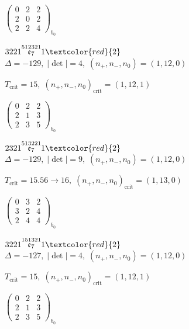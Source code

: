 \documentclass[10pt]{article}
\begin{document}
\hspace{2em}$\left(\begin{smallmatrix}0 & 2 & 2 \\ 2 & 0 & 2 \\ 2 & 2 & 4\end{smallmatrix}\right)_{\!b_0}$

\smallskip

$3221\overset{512321}{\mathfrak{e}_7}1\textcolor{red}{2}$ \quad $\Delta=-129,\; |\det|=4,\; (n_+,n_-,n_0)=(1,12,0)$

\hspace{1em}$T_{\text{crit}}=15,\; (n_+,n_-,n_0)_{\text{crit}}=(1,12,1)$

\hspace{2em}$\left(\begin{smallmatrix}0 & 2 & 2 \\ 2 & 1 & 3 \\ 2 & 3 & 5\end{smallmatrix}\right)_{\!b_0}$

\smallskip

$2321\overset{513221}{\mathfrak{e}_7}1\textcolor{red}{2}$ \quad $\Delta=-129,\; |\det|=9,\; (n_+,n_-,n_0)=(1,12,0)$

\hspace{1em}$T_{\text{crit}}=15.56 \to 16,\; (n_+,n_-,n_0)_{\text{crit}}=(1,13,0)$

\hspace{2em}$\left(\begin{smallmatrix}0 & 3 & 2 \\ 3 & 2 & 4 \\ 2 & 4 & 4\end{smallmatrix}\right)_{\!b_0}$

\smallskip

$3221\overset{151321}{\mathfrak{e}_7}1\textcolor{red}{2}$ \quad $\Delta=-127,\; |\det|=4,\; (n_+,n_-,n_0)=(1,12,0)$

\hspace{1em}$T_{\text{crit}}=15,\; (n_+,n_-,n_0)_{\text{crit}}=(1,12,1)$

\hspace{2em}$\left(\begin{smallmatrix}0 & 2 & 2 \\ 2 & 1 & 3 \\ 2 & 3 & 5\end{smallmatrix}\right)_{\!b_0}$
\end{document}
